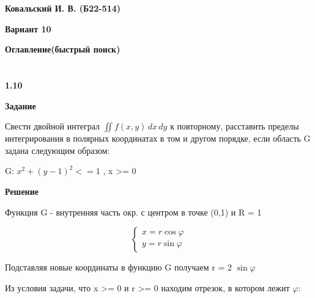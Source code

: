 \documentclass{article}
\begin{document}
\hypertarget{n0}{}
\begin{center}
    \textbf{\Large Ковальский И. В. (Б22-514)}
    \end{center}


\begin{center}
\textbf{\Large Вариант 10}
\end{center}


\begin{center}
    \textbf{\Large Оглавление(быстрый поиск)}
    \end{center}
 \hyperlink{n1}{\textcolor{blue}{}}
\hyperlink{n2}{\textcolor{blue}{}}
\hyperlink{n3}{\textcolor{blue}{}}
\hyperlink{n4}{\textcolor{blue}{}}
\hyperlink{n5}{\textcolor{blue}{}}
\hyperlink{n6}{\textcolor{blue}{}}
\hyperlink{n7}{\textcolor{blue}{}}
\hyperlink{n8}{\textcolor{blue}{}}
\hypertarget{n1}{}
\section{}

\begin{center}
    \textbf{\Large 1.10}
\end{center}


\textbf{\Large Задание}


Свести двойной интеграл 
$\iint  f(x,y) \,dx \,dy$
к повторному, расставить пределы интегрирования в полярных координатах в том и другом порядке, если область G задана следующим образом:
\begin{center}
G: $x^2 + (y-1)^2 <= 1$  , x >= 0
\end{center}

\textbf{\Large Решение}
\begin{center}
Функция G - внутренняя часть окр. с центром в точке (0,1) и R = 1
\end{center}

\begin{equation*}
\begin{cases}
    x = r 
\cos \varphi
\\
y = r
\sin \varphi
\end{cases}
\end{equation*}

Подставляя новые координаты в функцию G получаем
r = 2
$\sin \varphi$

Из условия задачи, что x >= 0 и r >= 0 находим отрезок, в котором лежит
$\varphi$:
\end{document}
